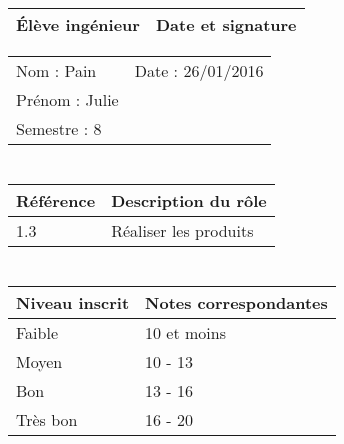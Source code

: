 \documentclass[11pt]{article}
\begin{document}

\begin{center}
\begin{table}[!hp]

	\begin{tabularx}{\linewidth}{|X|X|}
	\hline
	\rowcolor{gray!40} Élève ingénieur & Date et signature \\
	\hline
	\end{tabularx}
	\begin{tabularx}{\linewidth}{|X|X|}
	Nom : Pain & Date : 26/01/2016 \\ 
	Prénom : Julie & \\
	Semestre : 8 & \\
	\hline
	\end{tabularx}
\end{table}
\end{center}

\section*{\large\FR}

\begin{table}[!hp]
\centering
	\begin{tabularx}{\linewidth}{|X|X|}
	\hline
	\rowcolor{gray!40} Référence \WBSCourt & Description du rôle \\
	\hline
	 1.3 & Réaliser les produits \\
	 \hline
	\end{tabularx}
\end{table}


\section*{\large\FC}


\begin{table}[!hp]
\centering
	\begin{tabularx}{\linewidth}{|X|X|}
	\hline
	\rowcolor{gray!40} Niveau inscrit & Notes correspondantes \\
	\hline
	 Faible & 10 et moins \\
	 \hline
	 Moyen & 10 - 13 \\
	 \hline
	 Bon & 13 - 16 \\
	 \hline
	 Très bon & 16 - 20 \\
	 \hline
	\end{tabularx}
\end{table}
\end{document}

